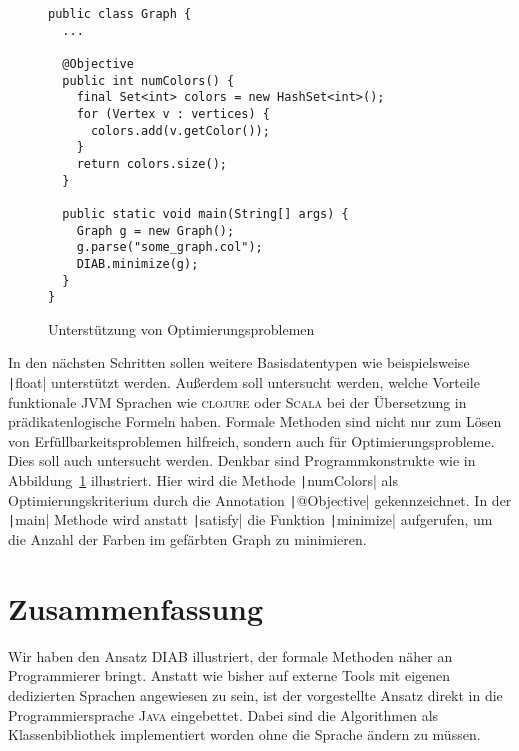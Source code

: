 \documentclass[a4paper,fontsize=12pt,headings=small,captions=tableheading,%
numbers=endperiod,abstracton,pdftex]{scrartcl}
\begin{document}
\begin{figure}[t]
  \centering
  \begin{verbatim}
public class Graph {
  ...

  @Objective
  public int numColors() {
    final Set<int> colors = new HashSet<int>();
    for (Vertex v : vertices) {
      colors.add(v.getColor());
    }
    return colors.size();
  }

  public static void main(String[] args) {
    Graph g = new Graph();
    g.parse("some_graph.col");
    DIAB.minimize(g);
  }
}
  \end{verbatim}
  \medskip
  \caption{Unterstützung von Optimierungsproblemen}
  \label{fig:optimization}
\end{figure}

In den nächsten Schritten sollen weitere Basisdatentypen wie beispielsweise
\texttt|float| unterstützt werden.  Außerdem soll untersucht werden,
welche Vorteile funktionale JVM Sprachen wie \textsc{clojure} oder
\textsc{Scala} bei der Übersetzung in prädikatenlogische Formeln haben.  Formale
Methoden sind nicht nur zum Lösen von Erfüllbarkeitsproblemen hilfreich, sondern
auch für Optimierungsprobleme.  Dies soll auch untersucht werden.  Denkbar sind
Programmkonstrukte wie in Abbildung~\ref{fig:optimization} illustriert.  Hier
wird die Methode \texttt|numColors| als Optimierungskriterium durch
die Annotation \texttt|@Objective| gekennzeichnet.  In der
\texttt|main| Methode wird anstatt \texttt|satisfy| die
Funktion \texttt|minimize| aufgerufen, um die Anzahl der Farben im
gefärbten Graph zu minimieren.


\section{Zusammenfassung}
Wir haben den Ansatz \textsc{DIAB} illustriert, der formale Methoden näher an
Programmierer bringt.  Anstatt wie bisher auf externe Tools mit eigenen
dedizierten Sprachen angewiesen zu sein, ist der vorgestellte Ansatz direkt in
die Programmiersprache \textsc{Java} eingebettet.  Dabei sind die Algorithmen
als Klassenbibliothek implementiert worden ohne die Sprache ändern zu müssen.


\end{document}
